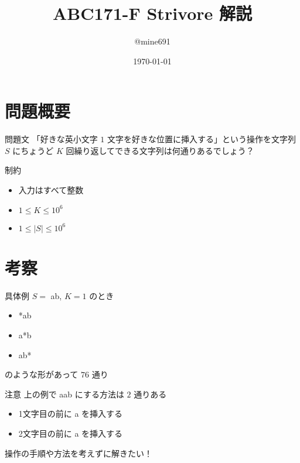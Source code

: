 \documentclass[dvipdfmx,12pt]{beamer}%
\title{ABC171-F Strivore 解説}
\author{@mine691}
\date{\today}
\begin{document}
\maketitle
%

\section{問題概要}
\begin{frame} %
\begin{block}{問題文}
「好きな英小文字 $1$ 文字を好きな位置に挿入する」という操作を文字列 $S$ にちょうど $K$ 回繰り返してできる文字列は何通りあるでしょう？
\end{block}

\begin{exampleblock}{制約}

	\begin{itemize}
		\item 入力はすべて整数
		\item $1 \leq K \leq 10 ^ {6}$
		\item $1 \leq | S |  \leq 10 ^ {6}$
	\end{itemize}

\end{exampleblock}
\end{frame}

\section{考察}
\begin{frame}
\begin{exampleblock}{具体例}
	$ S = $  ab, $ K = 1 $  のとき \\
	\begin{itemize}
	\item *ab
	\item a*b
	\item ab*
	\end{itemize}
	のような形があって $ 76 $ 通り
\end{exampleblock}

\begin{alertblock}{注意}
上の例で aab にする方法は $ 2 $ 通りある
\begin{itemize}
	\item 1文字目の前に a を挿入する
	\item 2文字目の前に a を挿入する
	\end{itemize}
\end{alertblock}
操作の手順や方法を考えずに解きたい！
\end{frame}
\end{document}
